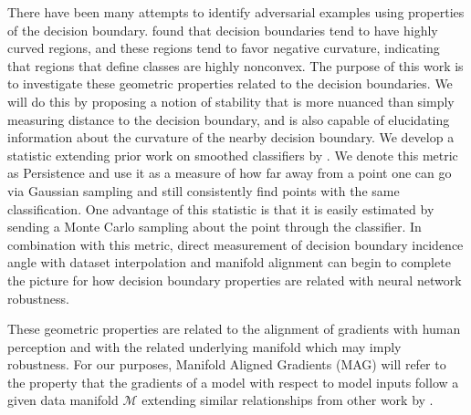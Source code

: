 There have been many attempts to identify adversarial examples using
properties of the decision boundary. \citet{Fawzi2018empirical} found
that decision boundaries tend to have highly curved regions, and these
regions tend to favor negative curvature, indicating that regions that
define classes are highly nonconvex. The purpose of this work is to
investigate these geometric properties related to the decision
boundaries. We will do this by proposing a notion of stability that is
more nuanced than simply measuring distance to the decision boundary,
and is also capable of elucidating information about the curvature of
the nearby decision boundary. We develop a statistic extending
prior work on smoothed classifiers by \citet{cohen2019certified}. We denote this metric as Persistence and use it as a measure of how far away from a point one can go via Gaussian sampling and still consistently find points with the same classification. One advantage of this statistic is that it is easily estimated by sending a Monte Carlo sampling about the point through the classifier. In combination with this metric, direct measurement of decision boundary incidence angle with dataset interpolation and manifold alignment can begin to complete the picture for how decision boundary properties are related with neural network robustness. 

 These geometric properties are related to the alignment of gradients
 with human perception \citep{ganz2022perceptually,
   kaur2019perceptually, shah2021input} and with the related
 underlying manifold \citep{kaur2019perceptually,
   ilyas2019adversarial} which may imply robustness. For our purposes,
 Manifold Aligned Gradients (MAG) will refer to the property that the
 gradients of a model with respect to model inputs follow a given data
 manifold $\mathcal{M}$ extending similar relationships from other
 work by \citet{shamir2021dimpled}. 

